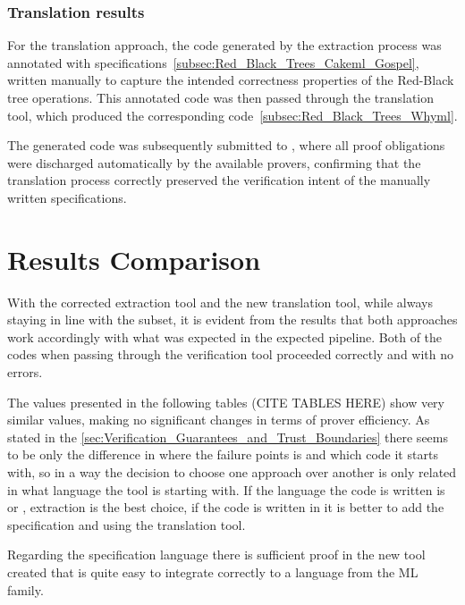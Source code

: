 \subsubsection{Translation results}

For the translation approach, the \cml code generated by the extraction process was annotated with \gospel specifications~\ref{subsec:Red_Black_Trees_Cakeml_Gospel}, 
written manually to capture the intended correctness properties of the Red-Black tree operations. This annotated \cml code was then passed through 
the translation tool, which produced the corresponding \whyml code~\ref{subsec:Red_Black_Trees_Whyml}. 

The generated \whyml code was subsequently submitted to \whythree, where all proof obligations were discharged automatically by the available provers, 
confirming that the translation process correctly preserved the verification intent of the manually written \gospel specifications.

\section{Results Comparison}

With the corrected \whythree extraction tool and the new translation tool, while always staying in line with the
\whyml subset, it is evident from the results that both approaches work accordingly with what was expected in the
expected pipeline. Both of the codes when passing through the verification tool proceeded correctly and with no errors.

The values presented in the following tables (CITE TABLES HERE) show very similar values, making no significant changes in terms of
prover efficiency. As stated in the \ref{sec:Verification_Guarantees_and_Trust_Boundaries} there seems to be only the difference in where the 
failure points is and which code it starts with, so in a way the decision to choose one approach over another is only related in what language
the tool is starting with. If the language the code is written is \ocaml or \whyml, extraction is the best choice, if the code is written in
\cml it is better to add the \gospel specification and using the translation tool.

Regarding the \gospel specification language there is sufficient proof in the new tool created that \gospel is quite easy to integrate correctly
to a language from the ML family.